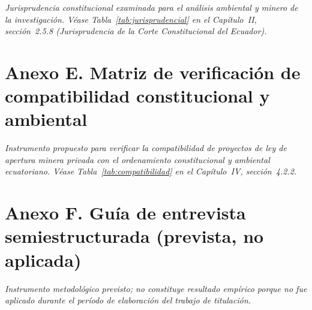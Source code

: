 \noindent\textit{Jurisprudencia constitucional examinada para el análisis ambiental y minero de la investigación. Véase Tabla~\ref{tab:jurisprudencial} en el Capítulo~II, sección~2.5.8 (Jurisprudencia de la Corte Constitucional del Ecuador).}

\section*{Anexo E. Matriz de verificación de compatibilidad constitucional y ambiental}

\noindent\textit{Instrumento propuesto para verificar la compatibilidad de proyectos de ley de apertura minera privada con el ordenamiento constitucional y ambiental ecuatoriano. Véase Tabla~\ref{tab:compatibilidad} en el Capítulo~IV, sección~4.2.2.}

\section*{Anexo F. Guía de entrevista semiestructurada (prevista, no aplicada)}

\noindent\textit{Instrumento metodológico previsto; no constituye resultado empírico porque no fue aplicado durante el período de elaboración del trabajo de titulación.}

\bigskip

